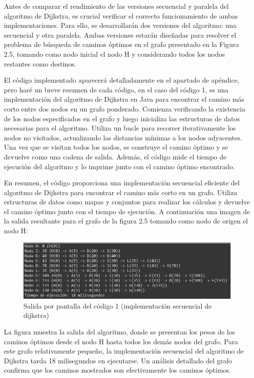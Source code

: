Antes de comparar el rendimiento de las versiones secuencial y paralela del algoritmo de Dijkstra, es crucial verificar el correcto funcionamiento de ambas implementaciones. Para ello, se desarrollarán dos versiones del algoritmo: una secuencial y otra paralela. Ambas versiones estarán diseñadas para resolver el problema de búsqueda de caminos óptimos en el grafo presentado en la Figura 2.5, tomando como nodo inicial el nodo H y considerando todos los nodos restantes como destinos.

El código implementado aparecerá detalladamente en el apartado de apéndice, pero haré un breve resumen de cada código, en el caso del código 1, es una implementación del algoritmo de Dijkstra en Java para encontrar el camino más corto entre dos nodos en un grafo ponderado. Comienza verificando la existencia de los nodos especificados en el grafo y luego inicializa las estructuras de datos necesarias para el algoritmo. Utiliza un bucle para recorrer iterativamente los nodos no visitados, actualizando las distancias mínimas a los nodos adyacentes. Una vez que se visitan todos los nodos, se construye el camino óptimo y se devuelve como una cadena de salida. Además, el código mide el tiempo de ejecución del algoritmo y lo imprime junto con el camino óptimo encontrado.

En resumen, el código proporciona una implementación secuencial eficiente del algoritmo de Dijkstra para encontrar el camino más corto en un grafo. Utiliza estructuras de datos como mapas y conjuntos para realizar los cálculos y devuelve el camino óptimo junto con el tiempo de ejecución. A continuación una imagen de la salida resultante para el grafo de la figura 2.5 tomando como nodo de origen el nodo H:

\begin{figure}[h]
	\centering \includegraphics[width=1\linewidth]{img/Salida_codigo_secuencial_7.jpg}
	\caption{Salida por pantalla del código 1 (implementación secuencial de dijkstra)}
	\label{fig:etiqueta1}
\end{figure}

La figura muestra la salida del algoritmo, donde se presentan los pesos de los caminos óptimos desde el nodo H hasta todos los demás nodos del grafo. Para este grafo relativamente pequeño, la implementación secuencial del algoritmo de Dijkstra tarda 18 milisegundos en ejecutarse. Un análisis detallado del grafo confirma que los caminos mostrados son efectivamente los caminos óptimos.


